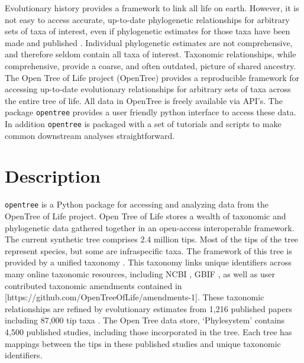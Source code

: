 \documentclass[oupdraft]{sysbio_sse}
\begin{document}
Evolutionary history provides a framework to link all life on earth. However, it is not easy to access accurate, up-to-date phylogenetic relationships for arbitrary sets of taxa of interest, even if phylogenetic estimates for those taxa have been made and published \citep{drew_lost_2013, mctavish_how_2017}. Individual phylogenetic estimates are not comprehensive, and therefore seldom contain all taxa of interest. Taxonomic relationships, while comprehensive, provide a coarse, and often outdated, picture of shared ancestry. 
The Open Tree of Life project (OpenTree) provides a reproducible framework for accessing up-to-date evolutionary relationships for arbitrary sets of taxa across the entire tree of life.
All data in OpenTree is freely available via API's.
The package \texttt{opentree} provides a user friendly python interface to access these data. In addition \texttt{opentree} is packaged with a set of tutorials and scripts to make common downstream analyses straightforward.

\bigskip
\section{Description}
\label{sec2}

\texttt{opentree} is a Python package for accessing and analyzing data from the OpenTree of Life project.
Open Tree of Life stores a wealth of taxonomic and phylogenetic data gathered together in an open-access interoperable framework.
The current synthetic tree \citep{opentreeoflife_open_2019} comprises 2.4 million tips.
Most of the tips of the tree represent species, but some are infraspecific taxa.
The framework of this tree is provided by a unified taxonomy \citep{opentreeoflife_open_2019-1, rees_automated_2017}.
This taxonomy links unique identifiers across many online taxonomic resources, including NCBI \citep{federhen_ncbi_2012}, GBIF \citep{gbif_secretariat_gbif_2019}, as well as user contributed taxonomic amendments contained in [https://github.com/OpenTreeOfLife/amendments-1].
These taxonomic relationships are refined by evolutionary estimates from 1,216 published papers including 87,000 tip taxa \citep{opentreeoflife_open_2019, redelings_supertree_2017}.
The Open Tree data store, `Phylesystem' \citep{mctavish_phylesystem_2015} contains 4,500 published studies, including those incorporated in the tree. Each tree has mappings between the tips in these published studies and unique taxonomic identifiers.
\end{document}
